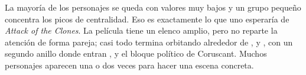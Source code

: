 
La mayor\'ia de los personajes se queda con valores muy bajos y un grupo peque\~no concentra los picos de centralidad. Eso es exactamente lo que uno esperar\'ia de \textit{Attack of the Clones}. La pel\'icula tiene un elenco amplio, pero no reparte la atenci\'on de forma pareja; casi todo termina orbitando alrededor de ,  y , con un segundo anillo donde entran ,  y el bloque pol\'itico de Coruscant. 
Muchos personajes aparecen una o dos veces para hacer una escena concreta.%


